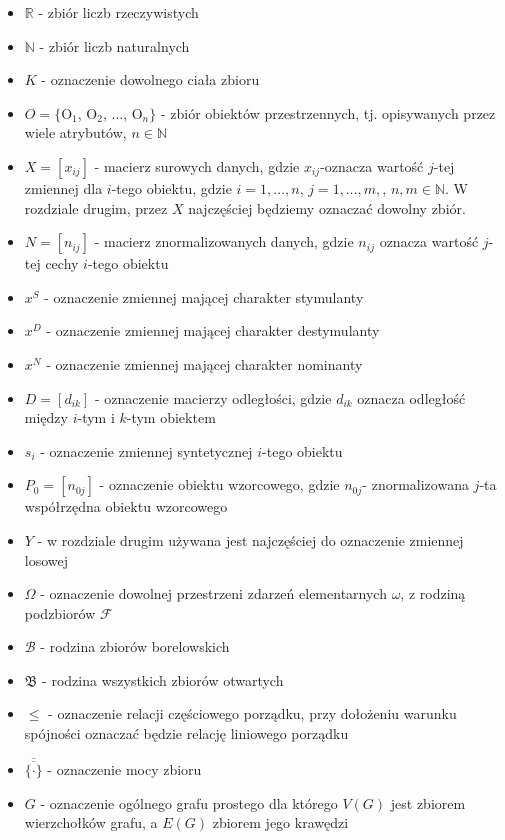 \documentclass[12pt,a4paper]{report}
\newcommand{\mediana}{\operatorname{med}}
\newcommand{\licznosc}[1]{\overline{\overline{#1}}}
\begin{document}
\begin{itemize}
\item $\mathbb{R}$ - zbiór liczb rzeczywistych
\item $\mathbb{N}$ - zbiór liczb naturalnych
\item $K$ - oznaczenie dowolnego ciała zbioru
\item $O = \{$O$_{1}$, O$_{2}$, $\dots$, O$_{n}\}$ - zbiór obiektów przestrzennych, tj. opisywanych przez wiele atrybutów, $n \in \mathbb{N}$
\item $X=[x_{ij}]$ - macierz surowych danych, gdzie $x_{ij}$-oznacza wartość $j$-tej zmiennej dla $i$-tego obiektu, gdzie $i=1,\ldots,n$, $j=1,\ldots, m,$, $n,m \in \mathbb{N}$. W rozdziale drugim, przez $X$ najczęściej będziemy oznaczać dowolny zbiór.
\item $N=[n_{ij}]$ - macierz znormalizowanych danych, gdzie $n_{ij}$ oznacza wartość $j$-tej cechy $i$-tego obiektu
\item $x^{S}$ - oznaczenie zmiennej mającej charakter stymulanty
\item $x^{D}$ - oznaczenie zmiennej mającej charakter destymulanty
\item $x^{N}$ - oznaczenie zmiennej mającej charakter nominanty
\item $D=[d_{ik}]$ - oznaczenie macierzy odległości, gdzie $d_{ik}$ oznacza odległość między $i$-tym i $k$-tym obiektem
\item $s_{i}$ - oznaczenie zmiennej syntetycznej $i$-tego obiektu
\item $P_{0}=[n_{0j}]$ - oznaczenie obiektu wzorcowego, gdzie $n_{0j}$- znormalizowana $j$-ta współrzędna obiektu wzorcowego
\item $Y$ - w rozdziale drugim używana jest najczęściej do oznaczenie zmiennej losowej
\item $\Omega$ - oznaczenie dowolnej przestrzeni zdarzeń elementarnych $\omega$, z rodziną podzbiorów $\mathcal{F}$
\item $\mathcal{B}$ - rodzina zbiorów borelowskich
\item $\mathfrak{B}$ - rodzina wszystkich zbiorów otwartych %
\item $\leq$ - oznaczenie relacji częściowego porządku, przy dołożeniu warunku spójności oznaczać będzie relację liniowego porządku
\item $\licznosc{\{\cdot\}}$ - oznaczenie mocy zbioru
\item $G$ - oznaczenie ogólnego grafu prostego dla którego $V(G)$ jest zbiorem wierzchołków grafu, a $E(G)$ zbiorem jego krawędzi



\end{itemize}
\end{document}
